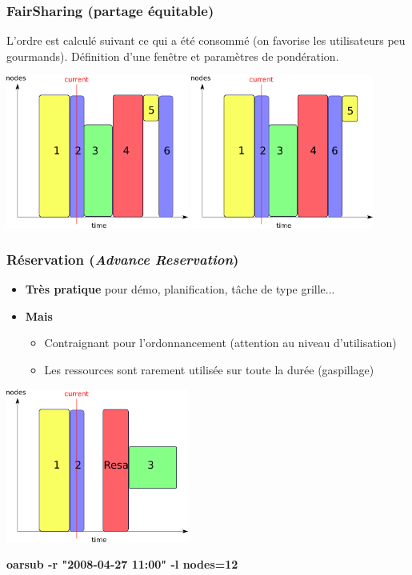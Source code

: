 \documentclass{beamer}
\begin{document}
\begin{frame}
	\frametitle{FairSharing (partage équitable)}
	L'ordre est calculé suivant ce qui a été consommé (on favorise les utilisateurs peu gourmands). Définition d'une fenêtre et paramètres de pondération.
	\begin{center}
		\includegraphics[width=6cm]{fifo.png}
		\includegraphics[width=6cm]{fairsharing.png}
	\end{center}
\end{frame}

\begin{frame}
	\frametitle{Réservation ({\em Advance Reservation})}

		\begin{itemize}
		\item {\bf Très pratique} pour démo, planification, tâche de type grille...
		\item {\bf Mais}
			\begin{itemize}
				\item Contraignant pour l'ordonnancement (attention au niveau d'utilisation)
				\item Les ressources sont rarement utilisée sur toute la durée (gaspillage)
			\end{itemize}
		\end{itemize}

	\begin{center}
		\includegraphics[width=6cm]{resa.png}
	\end{center}
	{\bf oarsub -r "2008-04-27 11:00" -l nodes=12}

\end{frame}
\end{document}
